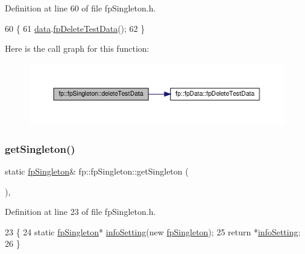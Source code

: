 Definition at line 60 of file fp\+Singleton.\+h.


\begin{DoxyCode}
60                                         \{
61                 \hyperlink{classfp_1_1fpSingleton_a2fa16ac6a0f66641749032eeee61b8e9}{data}.\hyperlink{classfp_1_1fpData_a996eedfc5ffe559ce1f6061af1efc1db}{fpDeleteTestData}();
62             \}
\end{DoxyCode}
Here is the call graph for this function\+:\nopagebreak
\begin{figure}[H]
\begin{center}
\leavevmode
\includegraphics[width=350pt]{classfp_1_1fpSingleton_aa4ac02c580b06ba16ed0160ec694438d_cgraph}
\end{center}
\end{figure}
\mbox{\label{classfp_1_1fpSingleton_a8bdae77b68521003e3fc630edec2e240}} 
\subsubsection{\texorpdfstring{get\+Singleton()}{getSingleton()}}
{\footnotesize\ttfamily static \hyperlink{classfp_1_1fpSingleton}{fp\+Singleton}\& fp\+::fp\+Singleton\+::get\+Singleton (\begin{DoxyParamCaption}{ }\end{DoxyParamCaption})\hspace{0.3cm}{\ttfamily [inline]}, {\ttfamily [static]}}



Definition at line 23 of file fp\+Singleton.\+h.


\begin{DoxyCode}
23                                               \{
24                 \textcolor{keyword}{static} \hyperlink{classfp_1_1fpSingleton_a049e41d4468d9b9f1e08788592c5f4cd}{fpSingleton}* \hyperlink{classfp_1_1fpSingleton_a0e2c02e7e7f730f59e5c1f10005d581c}{infoSetting}(\textcolor{keyword}{new} 
      \hyperlink{classfp_1_1fpSingleton_a049e41d4468d9b9f1e08788592c5f4cd}{fpSingleton});
25                 \textcolor{keywordflow}{return} *\hyperlink{classfp_1_1fpSingleton_a0e2c02e7e7f730f59e5c1f10005d581c}{infoSetting};
26             \}
\end{DoxyCode}
\mbox{\label{classfp_1_1fpSingleton_a86042ae6be6f59dfb90232678350011a}} 
